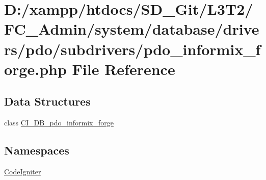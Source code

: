 \hypertarget{_admin_2system_2database_2drivers_2pdo_2subdrivers_2pdo__informix__forge_8php}{}\section{D\+:/xampp/htdocs/\+S\+D\+\_\+\+Git/\+L3\+T2/\+F\+C\+\_\+\+Admin/system/database/drivers/pdo/subdrivers/pdo\+\_\+informix\+\_\+forge.php File Reference}
\label{_admin_2system_2database_2drivers_2pdo_2subdrivers_2pdo__informix__forge_8php}
\subsection*{Data Structures}
\begin{DoxyCompactItemize}
\item 
class \hyperlink{class_c_i___d_b__pdo__informix__forge}{C\+I\+\_\+\+D\+B\+\_\+pdo\+\_\+informix\+\_\+forge}
\end{DoxyCompactItemize}
\subsection*{Namespaces}
\begin{DoxyCompactItemize}
\item 
 \hyperlink{namespace_code_igniter}{Code\+Igniter}
\end{DoxyCompactItemize}
